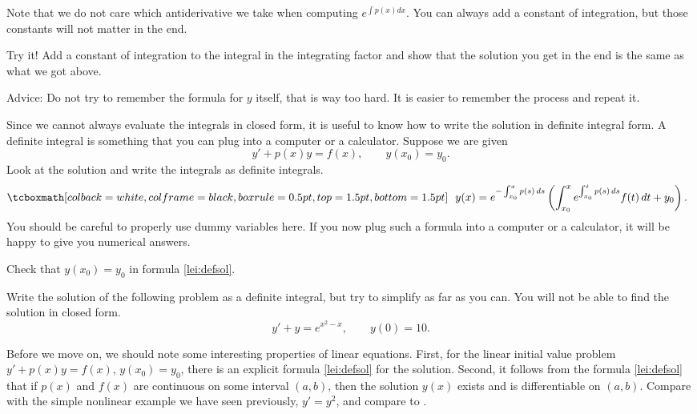 Note that we do not care which antiderivative we take when computing
$e^{\int p(x) dx}$.  You can always add a constant of integration,
but those constants
will not matter in the end.

\begin{exercise}
Try it!  Add a constant of integration to the integral in
the integrating factor and show that the solution you get in the end is the
same as what we got above.
\end{exercise}

Advice: Do not try to remember the formula for $y$ itself, that is way too
hard.  It is easier to remember the process and repeat it.

Since we cannot always evaluate the integrals in closed form, it is useful to
know how to write the solution in definite integral form.  A definite
integral is something that
you can plug into a computer or a calculator.  Suppose we are given
\begin{equation*}
y' + p(x) y = f(x) , \qquad y(x_0) = y_0 .
\end{equation*}
Look at the solution and write the integrals
as definite integrals.
\begin{equation} \label{lei:defsol}
\mybxbg{
~~
y(x) = e^{-\int_{x_0}^x p(s)\, ds} \left( \int_{x_0}^x e^{\int_{x_0}^t p(s)\, ds}
f(t) \,dt + y_0 \right).
~~
}
\end{equation}
You should
be careful to properly use dummy variables here.  If you now plug such a
formula into a
computer or a calculator, it will be happy to give you numerical answers.

\begin{exercise}
Check that $y(x_0) = y_0$ in formula \eqref{lei:defsol}.
\end{exercise}

\begin{exercise}
Write the solution of the following problem
as a definite integral, but try to simplify as far as you can.  You will not
be able to find the solution in closed form.
\begin{equation*}
y' + y = e^{x^2-x}, \qquad y(0) = 10 .
\end{equation*}
\end{exercise}

\begin{remark}
Before we move on, we should note some interesting properties of linear
equations.  First, for the linear initial value problem
$y' + p(x) y = f(x)$, $y(x_0) = y_0$,
there is an explicit formula \eqref{lei:defsol} for the
solution.  Second, it follows
from the formula \eqref{lei:defsol} that if $p(x)$
and $f(x)$ are continuous on some interval $(a,b)$, then the 
solution $y(x)$ exists and is differentiable on $(a,b)$.  Compare
with the simple nonlinear example we have seen previously, $y'=y^2$,
and compare to .
\end{remark}


